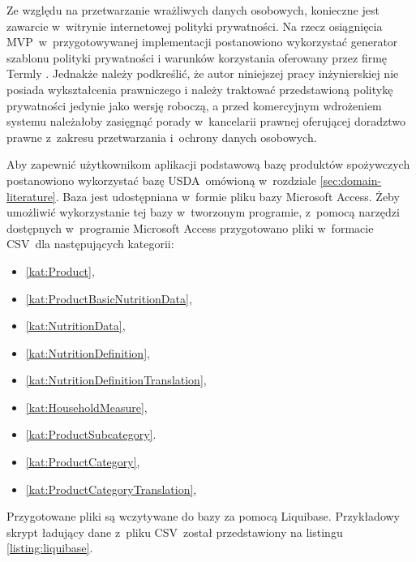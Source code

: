 \par
Ze względu na przetwarzanie wrażliwych danych osobowych, konieczne jest zawarcie w~witrynie internetowej polityki prywatności.
Na rzecz osiągnięcia MVP~w~przygotowywanej implementacji postanowiono wykorzystać generator szablonu polityki prywatności i warunków korzystania oferowany przez firmę Termly \cite{url:termly}.
Jednakże należy podkreślić, że autor niniejszej pracy inżynierskiej nie posiada wykształcenia prawniczego
i należy traktować przedstawioną politykę prywatności jedynie jako wersję roboczą,
a przed komercyjnym wdrożeniem systemu należałoby zasięgnąć porady w~kancelarii prawnej oferującej doradztwo prawne z~zakresu przetwarzania i~ochrony danych osobowych.

\par
Aby zapewnić użytkownikom aplikacji podstawową bazę produktów spożywczych postanowiono wykorzystać bazę USDA~omówioną w~rozdziale \ref{sec:domain-literature}.
Baza jest udostępniana w~formie pliku bazy Microsoft Access.
Żeby umożliwić wykorzystanie tej bazy w~tworzonym programie, z~pomocą narzędzi dostępnych w~programie Microsoft Access przygotowano pliki w~formacie CSV~dla następujących kategorii:
\begin{itemize}
    \item\ref{kat:Product},
    \item\ref{kat:ProductBasicNutritionData},
    \item\ref{kat:NutritionData},
    \item\ref{kat:NutritionDefinition},
    \item\ref{kat:NutritionDefinitionTranslation},
    \item\ref{kat:HouseholdMeasure},
    \item\ref{kat:ProductSubcategory}.
    \item\ref{kat:ProductCategory},
    \item\ref{kat:ProductCategoryTranslation},
\end{itemize}

\par
Przygotowane pliki są wczytywane do bazy za pomocą Liquibase.
Przykładowy skrypt ładujący dane z~pliku CSV~został przedstawiony na listingu \ref{listing:liquibase}.

